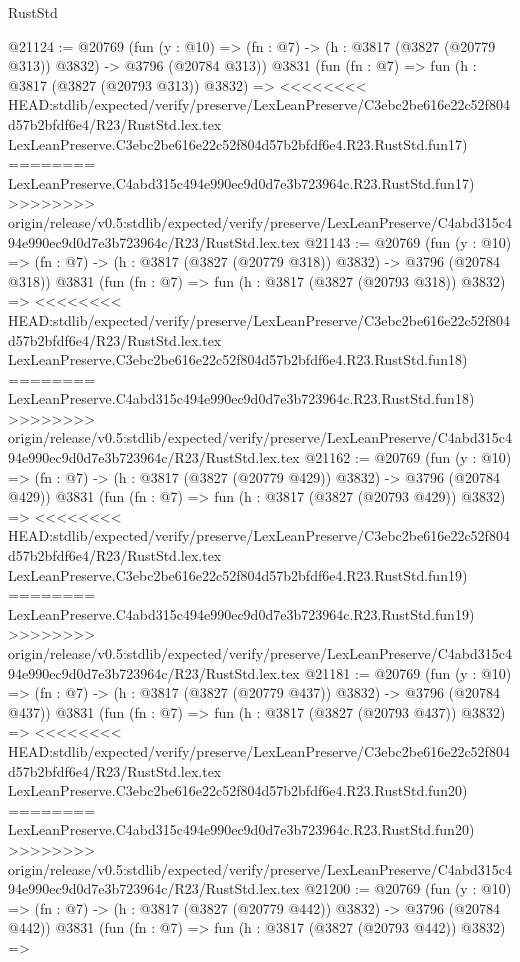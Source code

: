 \begin{lexlean}{RustStd}
\begin{coremodule}
{\begin{coremodule}
{{{{{{{{{{{{{{{{{{{{{{{{{{{{{{{{{{{@21124 := @20769
    (fun (y : @10) => (fn : @7) -> (h : @3817 (@3827 (@20779 @313)) @3832) -> @3796 (@20784 @313))
    @3831
    (fun (fn : @7) =>
    fun (h : @3817 (@3827 (@20793 @313)) @3832) =>
<<<<<<<< HEAD:stdlib/expected/verify/preserve/LexLeanPreserve/C3ebc2be616e22c52f804d57b2bfdf6e4/R23/RustStd.lex.tex
    LexLeanPreserve.C3ebc2be616e22c52f804d57b2bfdf6e4.R23.RustStd.fun17)
========
    LexLeanPreserve.C4abd315c494e990ec9d0d7e3b723964c.R23.RustStd.fun17)
>>>>>>>> origin/release/v0.5:stdlib/expected/verify/preserve/LexLeanPreserve/C4abd315c494e990ec9d0d7e3b723964c/R23/RustStd.lex.tex
@21143 := @20769
    (fun (y : @10) => (fn : @7) -> (h : @3817 (@3827 (@20779 @318)) @3832) -> @3796 (@20784 @318))
    @3831
    (fun (fn : @7) =>
    fun (h : @3817 (@3827 (@20793 @318)) @3832) =>
<<<<<<<< HEAD:stdlib/expected/verify/preserve/LexLeanPreserve/C3ebc2be616e22c52f804d57b2bfdf6e4/R23/RustStd.lex.tex
    LexLeanPreserve.C3ebc2be616e22c52f804d57b2bfdf6e4.R23.RustStd.fun18)
========
    LexLeanPreserve.C4abd315c494e990ec9d0d7e3b723964c.R23.RustStd.fun18)
>>>>>>>> origin/release/v0.5:stdlib/expected/verify/preserve/LexLeanPreserve/C4abd315c494e990ec9d0d7e3b723964c/R23/RustStd.lex.tex
@21162 := @20769
    (fun (y : @10) => (fn : @7) -> (h : @3817 (@3827 (@20779 @429)) @3832) -> @3796 (@20784 @429))
    @3831
    (fun (fn : @7) =>
    fun (h : @3817 (@3827 (@20793 @429)) @3832) =>
<<<<<<<< HEAD:stdlib/expected/verify/preserve/LexLeanPreserve/C3ebc2be616e22c52f804d57b2bfdf6e4/R23/RustStd.lex.tex
    LexLeanPreserve.C3ebc2be616e22c52f804d57b2bfdf6e4.R23.RustStd.fun19)
========
    LexLeanPreserve.C4abd315c494e990ec9d0d7e3b723964c.R23.RustStd.fun19)
>>>>>>>> origin/release/v0.5:stdlib/expected/verify/preserve/LexLeanPreserve/C4abd315c494e990ec9d0d7e3b723964c/R23/RustStd.lex.tex
@21181 := @20769
    (fun (y : @10) => (fn : @7) -> (h : @3817 (@3827 (@20779 @437)) @3832) -> @3796 (@20784 @437))
    @3831
    (fun (fn : @7) =>
    fun (h : @3817 (@3827 (@20793 @437)) @3832) =>
<<<<<<<< HEAD:stdlib/expected/verify/preserve/LexLeanPreserve/C3ebc2be616e22c52f804d57b2bfdf6e4/R23/RustStd.lex.tex
    LexLeanPreserve.C3ebc2be616e22c52f804d57b2bfdf6e4.R23.RustStd.fun20)
========
    LexLeanPreserve.C4abd315c494e990ec9d0d7e3b723964c.R23.RustStd.fun20)
>>>>>>>> origin/release/v0.5:stdlib/expected/verify/preserve/LexLeanPreserve/C4abd315c494e990ec9d0d7e3b723964c/R23/RustStd.lex.tex
@21200 := @20769
    (fun (y : @10) => (fn : @7) -> (h : @3817 (@3827 (@20779 @442)) @3832) -> @3796 (@20784 @442))
    @3831
    (fun (fn : @7) =>
    fun (h : @3817 (@3827 (@20793 @442)) @3832) =>
}}}}}}}}}}}}}}}}}}}}}}}}}}}}}}}}}}}
\end{coremodule}}
\end{coremodule}
\end{lexlean}
